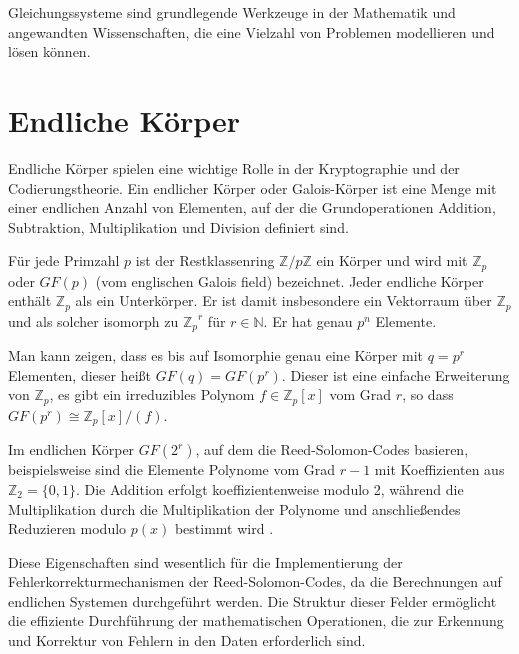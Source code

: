 Gleichungssysteme sind grundlegende Werkzeuge in der Mathematik und angewandten Wissenschaften, die eine Vielzahl von Problemen modellieren und lösen können.

\section{Endliche Körper}\label{sec:galois}

Endliche Körper spielen eine wichtige Rolle in der Kryptographie und der Codierungstheorie.
Ein endlicher Körper oder Galois-Körper ist eine Menge mit einer endlichen Anzahl von Elementen, auf der die Grundoperationen Addition, Subtraktion, Multiplikation und Division definiert sind.

Für jede Primzahl $p$ ist der Restklassenring $\mathbb{Z}/p\mathbb{Z}$  ein Körper und wird mit $\mathbb{Z}_p$ oder $GF(p)$ (vom englischen Galois field) bezeichnet.
Jeder endliche Körper enthält $\mathbb{Z}_p$ als ein Unterkörper.
Er ist damit insbesondere ein Vektorraum über $\mathbb{Z}_p$ und als solcher isomorph zu ${\mathbb{Z}_p}^r$ für $r\in\mathbb{N}$.
Er hat genau $p^n$ Elemente.

Man kann zeigen, dass es bis auf Isomorphie genau eine Körper mit $q=p^r$ Elementen, dieser heißt $GF(q)=GF(p^r)$.
Dieser ist eine einfache Erweiterung von $\mathbb{Z}_p$, \dahe es gibt ein irreduzibles Polynom $f\in\mathbb{Z}_p[x]$ vom Grad $r$, so dass $GF(p^r)\cong\mathbb{Z}_p[x]/(f)$.

Im endlichen Körper $GF(2^r)$, auf dem die Reed-Solomon-Codes basieren, beispielsweise sind die Elemente Polynome vom Grad $r-1$ mit Koeffizienten aus $\mathbb{Z}_2=\{0,1\}$.
Die Addition erfolgt koeffizientenweise modulo 2, während die Multiplikation durch die Multiplikation der Polynome und anschließendes Reduzieren modulo $p(x)$ bestimmt wird \cite{schulz-hankeBCHCodesCombined2023}.

Diese Eigenschaften sind wesentlich für die Implementierung der Fehlerkorrekturmechanismen der Reed-Solomon-Codes, da die Berechnungen auf endlichen Systemen durchgeführt werden.
Die Struktur dieser Felder ermöglicht die effiziente Durchführung der mathematischen Operationen, die zur Erkennung und Korrektur von Fehlern in den Daten erforderlich sind. 
